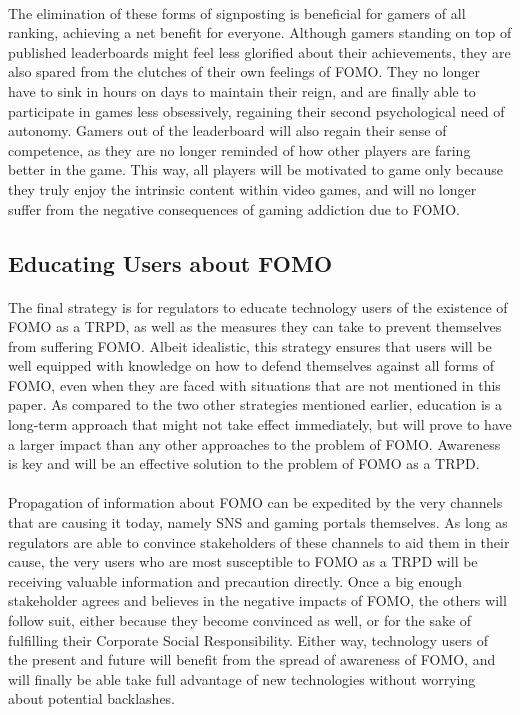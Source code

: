   \paragraph{}
        The elimination of these forms of signposting is beneficial for gamers of all ranking, achieving a net benefit for everyone. Although gamers standing on top of published leaderboards might feel less glorified about their achievements, they are also spared from the clutches of their own feelings of FOMO. They no longer have to sink in hours on days to maintain their reign, and are finally able to participate in games less obsessively, regaining their second psychological need of autonomy. Gamers out of the leaderboard will also regain their sense of competence, as they are no longer reminded of how other players are faring better in the game. This way, all players will be motivated to game only because they truly enjoy the intrinsic content within video games, and will no longer suffer from the negative consequences of gaming addiction due to FOMO.
 \subsection{Educating Users about FOMO}
  \paragraph{}
        The final strategy is for regulators to educate technology users of the existence of FOMO as a TRPD, as well as the measures they can take to prevent themselves from suffering FOMO. Albeit idealistic, this strategy ensures that users will be well equipped with knowledge on how to defend themselves against all forms of FOMO, even when they are faced with situations that are not mentioned in this paper. As compared to the two other strategies mentioned earlier, education is a long-term approach that might not take effect immediately, but will prove to have a larger impact than any other approaches to the problem of FOMO. Awareness is key and will be an effective solution to the problem of FOMO as a TRPD.
  \paragraph{}
        Propagation of information about FOMO can be expedited by the very channels that are causing it today, namely SNS and gaming portals themselves. As long as regulators are able to convince stakeholders of these channels to aid them in their cause, the very users who are most susceptible to FOMO as a TRPD will be receiving valuable information and precaution directly. Once a big enough stakeholder agrees and believes in the negative impacts of FOMO, the others will follow suit, either because they become convinced as well, or for the sake of fulfilling their Corporate Social Responsibility. Either way, technology users of the present and future will benefit from the spread of awareness of FOMO, and will finally be able take full advantage of new technologies without worrying about potential backlashes.